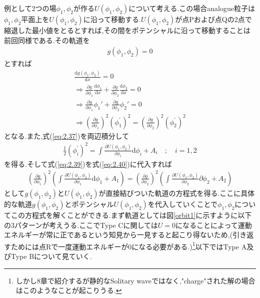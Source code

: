\documentclass[dvipdfmx,11pt,a4paper,oneside,openany]{jsbook}
\begin{document}
例として2つの場$\phi_1, \phi_2$が作る$U(\phi_1, \phi_2)$について考える.この場合analogue粒子は$\phi_1,\phi_2$平面上を$U(\phi_1,\phi_2)$に沿って移動する.$U(\phi_1,\phi_2)$が点Pおよび点Qの2点で縮退した最小値をとるとすれば,その間をポテンシャルに沿って移動することは前回同様である.その軌道を
\begin{align}
    g(\phi_1,\phi_2)=0
\end{align}
とすれば
\begin{align}
    \frac{\mathrm{d}g(\phi_1,\phi_2)}{\mathrm{d}x}=0\nonumber                                                                                                            \\
    \Rightarrow \frac{\partial g}{\partial \phi_1}\frac{\mathrm{d}\phi_1}{\mathrm{d}x}+\frac{\partial g}{\partial \phi_2}\frac{\mathrm{d}\phi_2}{\mathrm{d}x}=0\nonumber \\
    \Rightarrow \frac{\partial g}{\partial \phi_1}\phi_1'+\frac{\partial g}{\partial \phi_2}\phi_2'=0\nonumber                                                           \\
    \Rightarrow \left(\frac{\partial g}{\partial \phi_{1}}\right)^{2}\left(\phi_{1}^{'}\right)^{2}=\left(\frac{\partial g}{\partial \phi_{2}}\right)^{2}\left(\phi_{2}^{'}\right)^{2}\label{eq:2.39}
\end{align}
となる.また,式(\ref{eq:2.37})を両辺積分して
\begin{align}
    \frac{1}{2}\left(\phi_{i}^{'}\right)^{2}=\int \frac{\partial U\left(\phi_{1}, \phi_{2}\right)}{\partial \phi_{i}} \mathrm{d} \phi_{i}+A_{i}\quad; \quad i=1,2\label{eq:2.40}
\end{align}
を得る.そして式(\ref{eq:2.39})を式(\ref{eq:2.40})に代入すれば
\begin{align}
    \left(\frac{\partial g}{\partial \phi_{1}}\right)^{2}\left(\int \frac{\partial U\left(\phi_{1}, \phi_{2}\right)}{\partial \phi_{1}} \mathrm{d} \phi_{1}+A_{1}\right)=\left(\frac{\partial g}{\partial \phi_{2}}\right)^{2}\left(\int \frac{\partial U\left(\phi_{1}, \phi_{2}\right)}{\partial \phi_{2}} \partial \phi_{2}+A_{2}\right)\label{eq:2.41}
\end{align}
として$g(\phi_1,\phi_2)$と$U(\phi_1,\phi_2)$が直接結びついた軌道の方程式を得る.ここに具体的な軌道$g(\phi_1,\phi_2)$とポテンシャル$U(\phi_1,\phi_2)$を代入していくことで$\phi_1,\phi_2$についてこの方程式を解くことができる.まず軌道としては図\ref{orbit1}に示すように以下の3パターンが考えうる.ここでType Cに関しては$U=0$になることによって運動エネルギーが常に正であるという知見から一見すると起こり得ないため,(引き返すためには点Rで一度運動エネルギーが0になる必要がある.)\footnote{しかし8章で紹介するが静的なSolitary waveではなく,"charge"された解の場合はこのようなことが起こりうる.}以下ではType A及びType Bについて見ていく.
\end{document}
